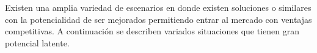 
Existen una amplia variedad de escenarios en donde existen soluciones \ecommerce o similares con la potencialidad de ser mejorados permitiendo entrar al mercado con ventajas competitivas. A continuación se describen variados situaciones que tienen gran potencial latente.

